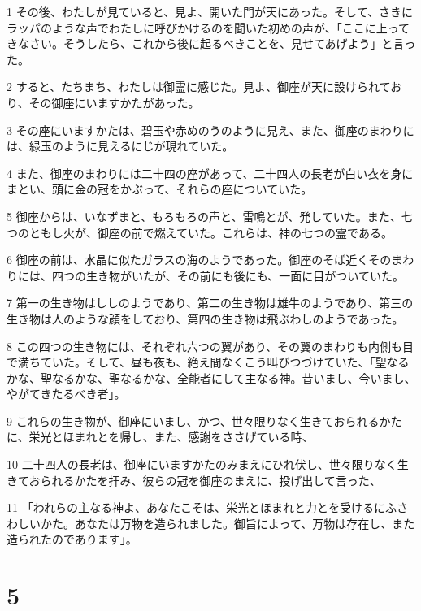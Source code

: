 \par 1 その後、わたしが見ていると、見よ、開いた門が天にあった。そして、さきにラッパのような声でわたしに呼びかけるのを聞いた初めの声が、「ここに上ってきなさい。そうしたら、これから後に起るべきことを、見せてあげよう」と言った。
\par 2 すると、たちまち、わたしは御霊に感じた。見よ、御座が天に設けられており、その御座にいますかたがあった。
\par 3 その座にいますかたは、碧玉や赤めのうのように見え、また、御座のまわりには、緑玉のように見えるにじが現れていた。
\par 4 また、御座のまわりには二十四の座があって、二十四人の長老が白い衣を身にまとい、頭に金の冠をかぶって、それらの座についていた。
\par 5 御座からは、いなずまと、もろもろの声と、雷鳴とが、発していた。また、七つのともし火が、御座の前で燃えていた。これらは、神の七つの霊である。
\par 6 御座の前は、水晶に似たガラスの海のようであった。御座のそば近くそのまわりには、四つの生き物がいたが、その前にも後にも、一面に目がついていた。
\par 7 第一の生き物はししのようであり、第二の生き物は雄牛のようであり、第三の生き物は人のような顔をしており、第四の生き物は飛ぶわしのようであった。
\par 8 この四つの生き物には、それぞれ六つの翼があり、その翼のまわりも内側も目で満ちていた。そして、昼も夜も、絶え間なくこう叫びつづけていた、「聖なるかな、聖なるかな、聖なるかな、全能者にして主なる神。昔いまし、今いまし、やがてきたるべき者」。
\par 9 これらの生き物が、御座にいまし、かつ、世々限りなく生きておられるかたに、栄光とほまれとを帰し、また、感謝をささげている時、
\par 10 二十四人の長老は、御座にいますかたのみまえにひれ伏し、世々限りなく生きておられるかたを拝み、彼らの冠を御座のまえに、投げ出して言った、
\par 11 「われらの主なる神よ、あなたこそは、栄光とほまれと力とを受けるにふさわしいかた。あなたは万物を造られました。御旨によって、万物は存在し、また造られたのであります」。

\chapter{5}

